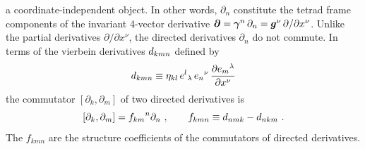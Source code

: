 \documentclass[twocolumn,showpacs,preprintnumbers,amsmath,amssymb,prb]{revtex4}
\begin{document}
a coordinate-independent object.
In other words,
$\partial_n$
constitute the tetrad frame components of the invariant 4-vector derivative
${\bm \partial}
= \bm{\gamma}^n \, \partial_n
= \bm{g}^\nu \, \partial / \partial x^\nu$.
Unlike the partial derivatives $\partial / \partial x^\nu$,
the directed derivatives $\partial_n$ do not commute.
In terms of the vierbein derivatives
$d_{kmn}$
defined by
\begin{equation}
\label{gammad}
  d_{kmn}
  \equiv
  \eta_{kl} \, {e^l}_\lambda \, {e_n}^\nu \,
  {\partial {e_m}^\lambda \over \partial x^\nu}
\end{equation}
the commutator
$\left[ \partial_k, \partial_m \right]$
of two directed derivatives is
\begin{equation}
\label{gammadcommutator}
  \left[ \partial_k, \partial_m \right]
  =
  {f_{km}}^n \partial_n
  \ ,
  \qquad
  f_{kmn} \equiv
  d_{nmk} - d_{nkm}
  \ .
\end{equation}
The $f_{kmn}$ are the structure coefficients
of the commutators of directed derivatives.
\end{document}
